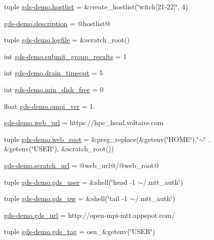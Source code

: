 \begin{DoxyCompactItemize}
\item 
tuple \hyperlink{namespacegds-demo_a021b9480541541d7ed577ad25eddf802}{gds-\/demo.\-hostlist} = \&create\-\_\-hostlist(\char`\"{}witch\mbox{[}21-\/22\mbox{]}\char`\"{}, 4)
\item 
\hyperlink{namespacegds-demo_a8ce383223449cab9f79575209d7dff2a}{gds-\/demo.\-description} = @hostlist@
\item 
tuple \hyperlink{namespacegds-demo_afef42fececa25d4cb15454b29b84e89b}{gds-\/demo.\-logfile} = \&scratch\-\_\-root()
\item 
int \hyperlink{namespacegds-demo_a62244f93362dda6490422a8beb98d7c6}{gds-\/demo.\-submit\-\_\-group\-\_\-results} = 1
\item 
int \hyperlink{namespacegds-demo_a87264971a99b7a376dc48ab3d1cd7469}{gds-\/demo.\-drain\-\_\-timeout} = 5
\item 
int \hyperlink{namespacegds-demo_a18c78141084f23069438c080ec110e3c}{gds-\/demo.\-min\-\_\-disk\-\_\-free} = 0
\item 
float \hyperlink{namespacegds-demo_aa7b4ee1aa52c894100818af632edc7dc}{gds-\/demo.\-ompi\-\_\-ver} = 1.
\item 
\hyperlink{namespacegds-demo_adc1de3305ccc0c692368fda2622c819f}{gds-\/demo.\-web\-\_\-url} = https\-://hpc\-\_\-head.\-voltaire.\-com
\item 
tuple \hyperlink{namespacegds-demo_aa8573740e3b2e7a32c35d743695d3748}{gds-\/demo.\-web\-\_\-root} = \&preg\-\_\-replace(\&getenv(\char`\"{}H\-O\-M\-E\char`\"{}),\char`\"{}$\sim$\char`\"{} . \&getenv(\char`\"{}U\-S\-E\-R\char`\"{}), \&scratch\-\_\-root())
\item 
\hyperlink{namespacegds-demo_a825b45a7f6cfdf6119a766e9938fbd38}{gds-\/demo.\-scratch\-\_\-url} = @web\-\_\-url@/@web\-\_\-root@
\item 
tuple \hyperlink{namespacegds-demo_aa9c2bc4e0238cad5803c9b33aace1e59}{gds-\/demo.\-gds\-\_\-user} = \&shell(\char`\"{}head -\/1 $\sim$/.mtt\-\_\-auth\char`\"{})
\item 
tuple \hyperlink{namespacegds-demo_ae8f847cfa457e3ef0c5fa370200cf06c}{gds-\/demo.\-gds\-\_\-pw} = \&shell(\char`\"{}tail -\/1 $\sim$/.mtt\-\_\-auth\char`\"{})
\item 
\hyperlink{namespacegds-demo_a9d1bc7e10684b9a35809bd57826a72eb}{gds-\/demo.\-gds\-\_\-url} = http\-://open-\/mpi-\/mtt.\-appspot.\-com/
\item 
tuple \hyperlink{namespacegds-demo_a89bef1abf605d724804682af1e5a0fb4}{gds-\/demo.\-gds\-\_\-tag} = osu\-\_\-\&getenv(\char`\"{}U\-S\-E\-R\char`\"{})

\end{DoxyCompactItemize}

